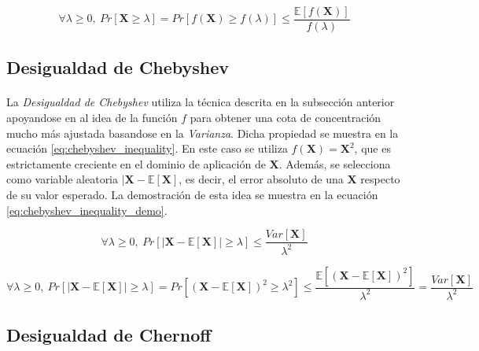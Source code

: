 \documentclass{subfiles}
\begin{document}
        \begin{equation}
        \label{eq:markov_inequality_function_positive}
          \forall \lambda \geq 0, \ Pr[\boldsymbol{X} \geq \lambda ] = Pr[f(\boldsymbol{X}) \geq f(\lambda) ] \leq \frac{\mathbb{E}[f(\boldsymbol{X})]}{f(\lambda)}
        \end{equation}


      \subsection{Desigualdad de Chebyshev}
      \label{sec:chebyshev_inequality}

        \paragraph{}
        La \emph{Desigualdad de Chebyshev} utiliza la técnica descrita en la subsección anterior apoyandose en al idea de la función $f$ para obtener una cota de concentración mucho más ajustada basandose en la \emph{Varianza}. Dicha propiedad se muestra en la ecuación \eqref{eq:chebyshev_inequality}. En este caso se utiliza $f(\boldsymbol{X}) = \boldsymbol{X}^2$, que es estrictamente creciente en el dominio de aplicación de $\boldsymbol{X}$. Además, se selecciona como variable aleatoria $|\boldsymbol{X} - \mathbb{E}[\boldsymbol{X}]$, es decir, el error absoluto de una  $\boldsymbol{X}$ respecto de su valor esperado. La demostración de esta idea se muestra en la ecuación \eqref{eq:chebyshev_inequality_demo}.

        \begin{equation}
        \label{eq:chebyshev_inequality}
          \forall \lambda \geq 0, \ Pr[|\boldsymbol{X} - \mathbb{E}[\boldsymbol{X}]| \geq \lambda]  \leq \frac{Var[\boldsymbol{X}]}{\lambda^2}
        \end{equation}

        \begin{equation}
        \label{eq:chebyshev_inequality_demo}
          \forall \lambda \geq 0, \
          Pr[|\boldsymbol{X} - \mathbb{E}[\boldsymbol{X}]| \geq \lambda] =
          Pr[(\boldsymbol{X} - \mathbb{E}[\boldsymbol{X}])^2 \geq \lambda^2] \leq
          \frac{\mathbb{E}[(\boldsymbol{X} - \mathbb{E}[\boldsymbol{X}])^2]}{\lambda^2} =
          \frac{Var[\boldsymbol{X}]}{\lambda^2}
        \end{equation}

      \subsection{Desigualdad de Chernoff}
      \label{sec:chernoff_inequality}
\end{document}

